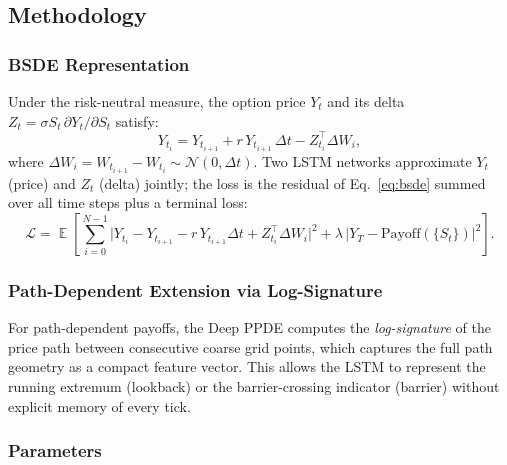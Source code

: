 \documentclass[12pt,a4paper]{article}
\DeclareMathOperator{\E}{\mathbb{E}}
\begin{document}
\subsection{Methodology}

\subsubsection{BSDE Representation}

Under the risk-neutral measure, the option price $Y_t$ and its delta
$Z_t = \sigma S_t\,\partial Y_t/\partial S_t$ satisfy:
\begin{equation}
  Y_{t_i} = Y_{t_{i+1}} + r\,Y_{t_{i+1}}\,\Delta t
             - Z_{t_i}^{\top}\Delta W_i,
  \label{eq:bsde}
\end{equation}
where $\Delta W_i = W_{t_{i+1}} - W_{t_i}\sim\mathcal{N}(0, \Delta t)$.
Two LSTM networks approximate $Y_t$ (price) and $Z_t$ (delta) jointly; the
loss is the residual of Eq.~\eqref{eq:bsde} summed over all time steps plus
a terminal loss:
\begin{equation}
  \mathcal{L} = \E\!\left[\sum_{i=0}^{N-1}
    \bigl|Y_{t_i} - Y_{t_{i+1}} - r\,Y_{t_{i+1}}\Delta t
    + Z_{t_i}^\top\Delta W_i\bigr|^2
    + \lambda\,\bigl|Y_T - \text{Payoff}(\{S_t\})\bigr|^2\right].
  \label{eq:ppde_loss}
\end{equation}

\subsubsection{Path-Dependent Extension via Log-Signature}

For path-dependent payoffs, the Deep PPDE computes the
\emph{log-signature} of the price path between consecutive coarse grid
points, which captures the full path geometry as a compact feature vector.
This allows the LSTM to represent the running extremum (lookback) or the
barrier-crossing indicator (barrier) without explicit memory of every tick.

\subsubsection{Parameters}
\end{document}
